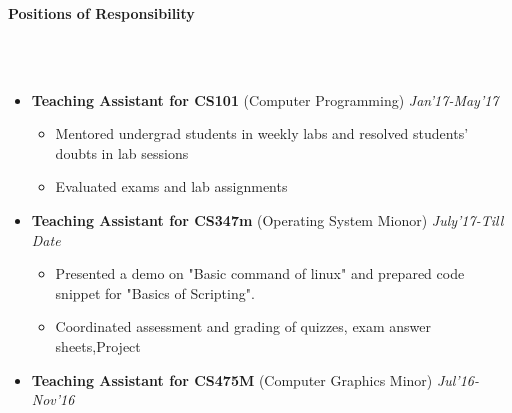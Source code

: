 \documentclass[a4paper,10pt]{article}
\newcommand{\lsep}{-0.5cm}
\newcommand{\resheading}[1]{{\small \colorbox{mygrey}{\begin{minipage}{0.975\textwidth}{\textbf{#1 \vphantom{p\^{E}}}}\end{minipage}}}}
\begin{document}
\hspace{0.5cm}\\
\hspace{0.5cm}\\
\hspace{0.5cm}\\
\hspace{0.5cm}\\
\hspace{0.5cm}\\
\hspace{0.5cm}\\
\hspace{0.5cm}\\
\hspace{0.5cm}\\
\hspace{0.5cm}\\
\hspace{0.5cm}\\
\hspace{0.5cm}\\
\hspace{0.5cm}\\
\hspace{0.5cm}\\
\hspace{0.5cm}\\
\hspace{0.5cm}\\[-0.2cm]

\resheading{\textbf{\large Positions of Responsibility} }\\[\lsep] \\[-0.3cm]
\begin{itemize}
  

	\item \textbf{Teaching Assistant for CS101} (Computer Programming) \emph{Jan'17-May'17}\\[-0.6cm]
	\begin{itemize}
    \item Mentored  undergrad students in weekly labs and resolved students’ doubts in lab sessions\\[-0.5cm]
    \item Evaluated exams and lab assignments\\[-0.5cm]
	\end{itemize}
\item \textbf{Teaching Assistant for CS347m} (Operating System Mionor) \emph{July'17-Till Date}\\[-0.6cm]
	\begin{itemize}
		\item Presented a demo on "Basic command  of linux"  and prepared code snippet for "Basics of Scripting".\\[-0.5cm]
	    \item Coordinated assessment and grading of quizzes, exam answer sheets,Project	
	\end{itemize}

\item \textbf{Teaching Assistant for CS475M} (Computer Graphics Minor) \emph{Jul'16-Nov'16}\\[-0.6cm]
\end{itemize}
\vskip 0.15in
\end{document}
